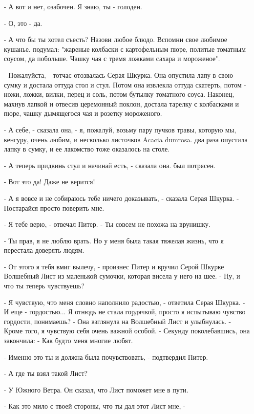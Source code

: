 \par- А вот и нет, озабочен. Я знаю, ты - голоден.
\par- О, это - да.
\par- А что бы ты хотел съесть? Назови любое блюдо. Вспомни свое 
любимое кушанье.
 подумал: "жареные колбаски с картофельным пюре, политые 
томатным соусом, да побольше. Чашку чая с тремя ложками сахара и 
мороженое".
\par- Пожалуйста, - тотчас отозвалась Серая Шкурка. Она опустила лапу 
в свою сумку и достала оттуда стол и стул. Потом она извлекла оттуда 
скатерть, потом - ножи, ложки, вилки, перец и соль, потом бутылку 
томатного соуса. Наконец, махнув лапкой и отвесив церемонный поклон, 
достала тарелку с колбасками и пюре, чашку дымящегося чая и розетку 
мороженого.
\par- А себе, - сказала она, - я, пожалуй, возьму пару пучков травы, 
которую мы, кенгуру, очень любим, и несколько листочков Acacia 
dumrosa.
 два раза опустила лапку в сумку, и ее лакомство тоже оказалось 
на столе.
\par- А теперь придвинь стул и начинай есть, - сказала она.
 был потрясен.
\par- Вот это да! Даже не верится!
\par- А я вовсе и не собираюсь тебе ничего доказывать, - сказала Серая 
Шкурка. - Постарайся просто поверить мне.
\par- Я тебе верю, - отвечал Питер. - Ты совсем не похожа на врунишку.
\par- Ты прав, я не люблю врать. Но у меня была такая тяжелая жизнь, 
что я перестала доверять людям.
\par- От этого я тебя вмиг вылечу, - произнес Питер и вручил Серой 
Шкурке Волшебный Лист из маленькой сумочки, которая висела у него на 
шее. - Ну, и что ты теперь чувствуешь?
\par- Я чувствую, что меня словно наполнило радостью, - ответила Серая 
Шкурка. - И еще - гордостью... Я отнюдь не стала гордячкой, просто я 
испытываю чувство гордости, понимаешь? - Она взглянула на Волшебный 
Лист и улыбнулась. - Кроме того, я чувствую себя очень важной особой. 
- Секунду поколебавшись, она закончила: - Как будто меня многие любят.
\par- Именно это ты и должна была почувствовать, - подтвердил Питер.
\par- А где ты взял такой Лист?
\par- У Южного Ветра. Он сказал, что Лист поможет мне в пути.
\par- Как это мило с твоей стороны, что ты дал этот Лист мне, - 
